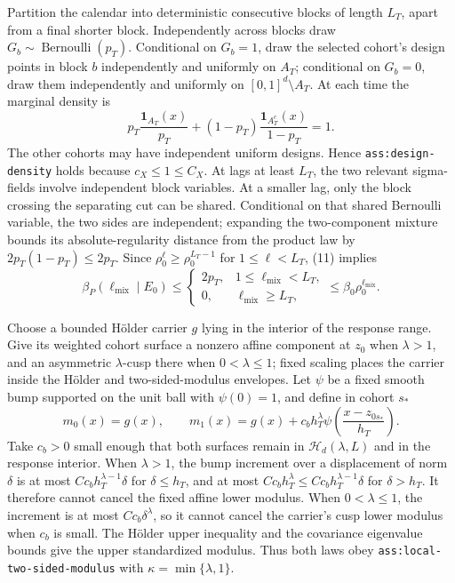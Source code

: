 Partition the calendar into deterministic consecutive blocks of length
\(L_T\), apart from a final shorter block.  Independently across blocks draw
\(G_b\sim\operatorname{Bernoulli}(p_T)\).  Conditional on \(G_b=1\), draw the
selected cohort's design points in block \(b\) independently and uniformly on
\(A_T\); conditional on \(G_b=0\), draw them independently and uniformly on
\([0,1]^d\setminus A_T\).  At each time the marginal density is
\[
p_T\frac{\mathbf 1_{A_T}(x)}{p_T}
+(1-p_T)\frac{\mathbf 1_{A_T^c}(x)}{1-p_T}=1.
\tag{13}
\]
The other cohorts may have independent uniform designs.  Hence
\texttt{ass:design-density} holds because \(c_X\le1\le C_X\).  At lags at
least \(L_T\), the two relevant sigma-fields involve independent block
variables.  At a smaller lag, only the block crossing the separating cut can
be shared.  Conditional on that shared Bernoulli variable, the two sides are
independent; expanding the two-component mixture bounds its
absolute-regularity distance from the product law by
\(2p_T(1-p_T)\le2p_T\).  Since
\(\rho_0^\ell\ge\rho_0^{L_T-1}\) for \(1\le\ell<L_T\), (11) implies
\[
\beta_P(\ell_{\mathrm{mix}}\mid E_0)
\le
\begin{cases}
2p_T,&1\le\ell_{\mathrm{mix}}<L_T,\\
0,&\ell_{\mathrm{mix}}\ge L_T,
\end{cases}
\le\beta_0\rho_0^{\ell_{\mathrm{mix}}}.
\tag{14}
\]

Choose a bounded H\"older carrier \(g\) lying in the interior of the response
range.  Give its weighted cohort surface a nonzero affine component at
\(z_0\) when \(\lambda>1\), and an asymmetric \(\lambda\)-cusp there when
\(0<\lambda\le1\); fixed scaling places the carrier inside the H\"older and
two-sided-modulus envelopes.  Let \(\psi\) be a fixed smooth bump supported on
the unit ball with \(\psi(0)=1\), and define in cohort \(s_*\)
\[
m_0(x)=g(x),
\qquad
m_1(x)=g(x)+c_bh_T^\lambda
\psi\left(\frac{x-z_{0s_*}}{h_T}\right).
\tag{15}
\]
Take \(c_b>0\) small enough that both surfaces remain in
\(\mathcal H_d(\lambda,L)\) and in the response interior.  When
\(\lambda>1\), the bump increment over a displacement of norm \(\delta\) is
at most \(Cc_bh_T^{\lambda-1}\delta\) for \(\delta\le h_T\), and at most
\(Cc_bh_T^\lambda\le Cc_bh_T^{\lambda-1}\delta\) for \(\delta>h_T\).
It therefore cannot cancel the fixed affine lower modulus.  When
\(0<\lambda\le1\), the increment is at most \(Cc_b\delta^\lambda\), so it
cannot cancel the carrier's cusp lower modulus when \(c_b\) is small.  The
H\"older upper inequality and the covariance eigenvalue bounds give the upper
standardized modulus.  Thus both laws obey
\texttt{ass:local-two-sided-modulus} with
\(\kappa=\min\{\lambda,1\}\).

